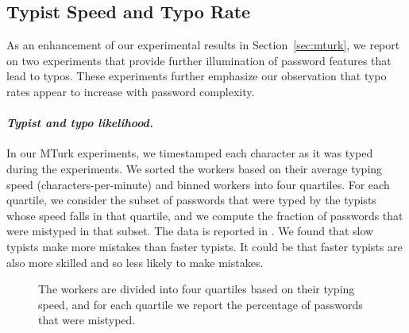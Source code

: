 \subsection{Typist Speed and Typo Rate}
\label{sec:typistspeed}

As an enhancement of our experimental results in Section~\ref{sec:mturk}, we report on two experiments that provide further illumination of password features that lead to typos. These experiments further emphasize our observation  that typo rates appear to increase with password complexity.

\paragraph{\em Typist and typo likelihood.} 
In our MTurk experiments, we timestamped each character as
it was typed during the experiments.  We sorted the workers based on their
average typing speed (characters-per-minute) and binned workers into four
quartiles. For each quartile, we consider the subset of passwords that were
typed by the typists whose speed falls in that quartile, and we compute the
fraction of passwords that were mistyped in that subset. The data is reported in
.  We found that slow typists make more mistakes than
faster typists. It could be that faster typists are also more skilled and so
less likely to make mistakes.

\begin{figure}[t]
  \centering
  \caption{ The workers are divided into four quartiles based on their
    typing speed, and for each quartile we report the percentage of
    passwords that were mistyped.}
  \label{fig:typespeed-typo}
\end{figure}



